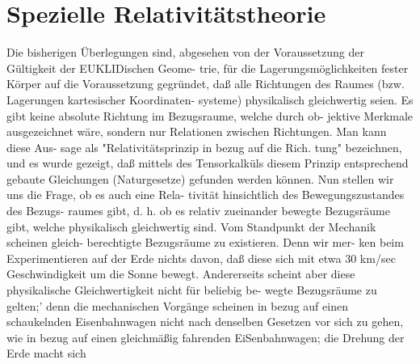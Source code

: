 %
%

\section{Spezielle Relativitätstheorie}
\label{sec:spe-1}

Die bisherigen Überlegungen sind, abgesehen von der
Voraussetzung der Gültigkeit der EUKLIDischen Geome-
trie, für die Lagerungsmöglichkeiten fester Körper auf
die Voraussetzung gegründet, daß alle Richtungen des
Raumes (bzw. Lagerungen kartesischer Koordinaten-
systeme) physikalisch gleichwertig seien. Es gibt keine
absolute Richtung im Bezugsraume, welche durch ob-
jektive Merkmale ausgezeichnet wäre, sondern nur
Relationen zwischen Richtungen. Man kann diese Aus-
sage als "Relativitätsprinzip in bezug auf die Rich.
tung" bezeichnen, und es wurde gezeigt, daß mittels
des Tensorkalküls diesem Prinzip entsprechend gebaute
Gleichungen (Naturgesetze) gefunden werden können.
Nun stellen wir uns die Frage, ob es auch eine Rela-
tivität hinsichtlich des Bewegungszustandes des Bezugs-
raumes gibt, d. h. ob es relativ zueinander bewegte
Bezugsräume gibt, welche physikalisch gleichwertig
sind. Vom Standpunkt der Mechanik scheinen gleich-
berechtigte Bezugsräume zu existieren. Denn wir mer-
ken beim Experimentieren auf der Erde nichts davon,
daß diese sich mit etwa 30 km/sec Geschwindigkeit um
die Sonne bewegt. Andererseits scheint aber diese
physikalische Gleichwertigkeit nicht für beliebig be-
wegte Bezugsräume zu gelten;' denn die mechanischen
Vorgänge scheinen in bezug auf einen schaukelnden
Eisenbahnwagen nicht nach denselben Gesetzen vor sich
zu gehen, wie in bezug auf einen gleichmäßig fahrenden
EiSenbahnwagen; die Drehung der Erde macht sich
